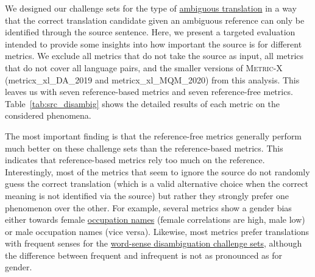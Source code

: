 \documentclass[11pt]{article}
\begin{document}
We designed our challenge sets for the type of \hyperref[sec:source-disambig]{ambiguous translation} in a way that the correct translation candidate given an ambiguous reference can only be identified through the source sentence. Here, we present a targeted evaluation intended to provide some insights into how important the source is for different metrics. We exclude all metrics that do not take the source as input, all metrics that do not cover all language pairs, and the smaller versions of \textsc{Metric-X} (metricx\_xl\_DA\_2019 and metricx\_xl\_MQM\_2020) from this analysis. This leaves us with 
seven reference-based metrics and seven reference-free metrics. Table~\ref{tab:src_disambig} shows the detailed results of each metric on the considered phenomena.

The most important finding is that the reference-free metrics generally perform much better on these challenge sets than the reference-based metrics. This indicates that reference-based metrics rely too much on the reference. Interestingly, most of the metrics that seem to ignore the source do not randomly guess the correct translation (which is a valid alternative choice when the correct meaning is not identified via the source) but rather they strongly prefer one phenomenon over the other. For example, several metrics show a gender bias either towards female \hyperref[subsec:gender_in_occupation_names]{occupation names} (female correlations are high, male low) or male occupation names (vice versa). Likewise, most metrics prefer translations with frequent senses for the \hyperref[subsec:wsd]{word-sense disambiguation challenge sets}, although the difference between frequent and infrequent is not as pronounced as for gender.
\end{document}
